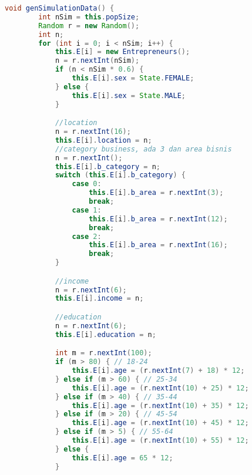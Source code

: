 \begin{lstlisting}[language=Java, caption=CA.java]
    void genSimulationData() {
        int nSim = this.popSize;
        Random r = new Random();
        int n;
        for (int i = 0; i < nSim; i++) {
            this.E[i] = new Entrepreneurs();
            n = r.nextInt(nSim);
            if (n < nSim * 0.6) {
                this.E[i].sex = State.FEMALE;
            } else {
                this.E[i].sex = State.MALE;
            }

            //location
            n = r.nextInt(16);
            this.E[i].location = n;
            //category business, ada 3 dan area bisnis
            n = r.nextInt();
            this.E[i].b_category = n;
            switch (this.E[i].b_category) {
                case 0:
                    this.E[i].b_area = r.nextInt(3);
                    break;
                case 1:
                    this.E[i].b_area = r.nextInt(12);
                    break;
                case 2:
                    this.E[i].b_area = r.nextInt(16);
                    break;
            }

            //income
            n = r.nextInt(6);
            this.E[i].income = n;

            //education
            n = r.nextInt(6);
            this.E[i].education = n;

            int m = r.nextInt(100);
            if (m > 80) { // 18-24
                this.E[i].age = (r.nextInt(7) + 18) * 12;
            } else if (m > 60) { // 25-34
                this.E[i].age = (r.nextInt(10) + 25) * 12;
            } else if (m > 40) { // 35-44
                this.E[i].age = (r.nextInt(10) + 35) * 12;
            } else if (m > 20) { // 45-54
                this.E[i].age = (r.nextInt(10) + 45) * 12;
            } else if (m > 5) { // 55-64
                this.E[i].age = (r.nextInt(10) + 55) * 12;
            } else {
                this.E[i].age = 65 * 12;
            }


\end{lstlisting}
